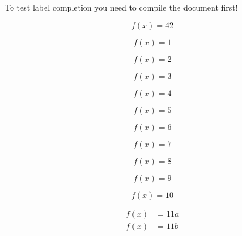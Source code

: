 \documentclass{article}
\begin{document}
To test label completion you need to compile the document first!

\begin{equation}
  f(x) = 42
  \label{eq:main-is-working}
\end{equation}







\begin{equation}
  \label{eq:test1}
  f(x) = 1
\end{equation}

\begin{equation}
  \label{eq:test2}
  f(x) = 2
\end{equation}

\begin{equation}
  \label{eq:test3}
  f(x) = 3
\end{equation}

\begin{equation}
  \label{eq:test4}
  f(x) = 4
\end{equation}

\begin{equation}
  \label{eq:test5}
  f(x) = 5
\end{equation}

\begin{equation}
  \label{eq:test6}
  f(x) = 6
\end{equation}

\begin{equation}
  \label{eq:test7}
  f(x) = 7
\end{equation}

\begin{equation}
  \label{eq:test8}
  f(x) = 8
\end{equation}

\begin{equation}
  \label{eq:test9}
  f(x) = 9
\end{equation}

\begin{equation}
  \label{eq:test10}
  f(x) = 10
\end{equation}

\begin{subequations}
  \begin{align}
    \label{eq:test11a}
    f(x) &= 11a \\
    \label{eq:test11b}
    f(x) &= 11b
  \end{align}
\end{subequations}
\end{document}
